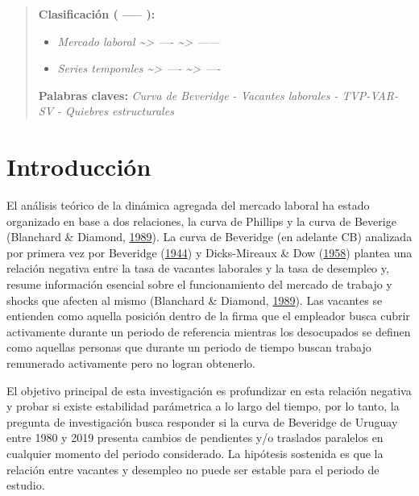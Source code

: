 \documentclass[12pt,oneside]{reedthesis}
\providecommand{\tightlist}{%
  \setlength{\itemsep}{0pt}\setlength{\parskip}{0pt}}
\begin{document}
\begin{abstract}
    \textbf{Clasificación ( ----- ):}
    \begin{itemize}
    \tightlist
    \item
      \emph{Mercado laboral \textasciitilde{}\textgreater{} ---- \textasciitilde{}\textgreater{} ------}
    \item
      \emph{Series temporales \textasciitilde{}\textgreater{} ---- \textasciitilde{}\textgreater{} ----}
    \end{itemize}
    \textbf{Palabras claves:} \emph{Curva de Beveridge - Vacantes laborales - TVP-VAR-SV - Quiebres estructurales}
  \end{abstract}

  \hypersetup{linkcolor=black}
  \setcounter{tocdepth}{2}
  \tableofcontents

  \listoftables

  \listoffigures

\mainmatter %
\pagestyle{fancyplain} %

\hypertarget{intro}{%
\chapter{Introducción}\label{intro}}

El análisis teórico de la dinámica agregada del mercado laboral ha estado organizado en base a dos relaciones, la curva de Phillips y la curva de Beverige (Blanchard \& Diamond, \protect\hyperlink{ref-Blanchard1989}{1989}). La curva de Beveridge (en adelante CB) analizada por primera vez por Beveridge (\protect\hyperlink{ref-Beveridge}{1944}) y Dicks-Mireaux \& Dow (\protect\hyperlink{ref-Dicks-Mireaux1958}{1958}) plantea una relación negativa entre la tasa de vacantes laborales y la tasa de desempleo y, resume información esencial sobre el funcionamiento del mercado de trabajo y shocks que afecten al mismo (Blanchard \& Diamond, \protect\hyperlink{ref-Blanchard1989}{1989}). Las vacantes se entienden como aquella posición dentro de la firma que el empleador busca cubrir activamente durante un periodo de referencia mientras los desocupados se definen como aquellas personas que durante un periodo de tiempo buscan trabajo remunerado activamente pero no logran obtenerlo.

El objetivo principal de esta investigación es profundizar en esta relación negativa y probar si existe estabilidad parámetrica a lo largo del tiempo, por lo tanto, la pregunta de investigación busca responder si la curva de Beveridge de Uruguay entre 1980 y 2019 presenta cambios de pendientes y/o traslados paralelos en cualquier momento del periodo considerado. La hipótesis sostenida es que la relación entre vacantes y desempleo no puede ser estable para el periodo de estudio.
\end{document}
